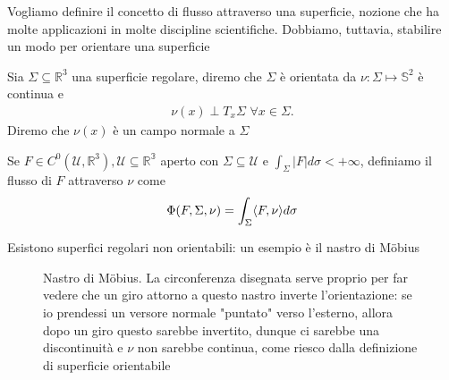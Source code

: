 Vogliamo definire il concetto di flusso attraverso una superficie, nozione che ha molte applicazioni in molte discipline scientifiche. Dobbiamo, tuttavia, stabilire un modo per orientare una superficie 
\begin{definition}
	Sia $\Sigma \subseteq \mathbb{R}^3$ una superficie regolare, diremo che $\Sigma$ è orientata da $\nu: \Sigma \mapsto \mathbb{S}^2$ è continua e 
	\begin{align*}
	\nu(x) \perp T_{x} \Sigma \, \, \forall x \in \Sigma.
	\end{align*}
	Diremo che $\nu(x)$ è un campo normale a $\Sigma$
\end{definition}

\begin{definition}
	Se $F \in C^0(\mathcal{U}, \mathbb{R}^3), \mathcal{U} \subseteq \mathbb{R^3}$ aperto con $\Sigma \subseteq \mathcal{U}$ e $\int_\Sigma |F|d\sigma < +\infty$, definiamo il flusso di $F$ attraverso $\nu$ come
	$$
	\Phi(F, \Sigma, \nu) = \int_\Sigma \langle F, \nu \rangle d\sigma
	$$
\end{definition}
\begin{remark}
	Esistono superfici regolari non orientabili: un esempio è il nastro di Möbius
	\begin{figure}[H]
		\centering
		  \caption{Nastro di Möbius. La circonferenza disegnata serve proprio per far vedere che un giro attorno a questo nastro inverte l'orientazione: se io prendessi un versore normale "puntato" verso l'esterno, allora dopo un giro questo sarebbe invertito, dunque ci sarebbe una discontinuità e $\nu$ non sarebbe continua,
		  come riesco dalla definizione di superficie orientabile}
	\end{figure}
\end{remark}
